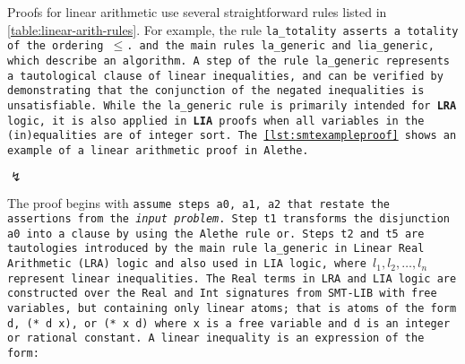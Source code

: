 Proofs for linear arithmetic use several straightforward rules listed in \cref{table:linear-arith-rules}.
For example, the rule \tt{la\_totality} asserts a totality of the ordering $\leq$.
and the main rules \tt{la\_generic} and \tt{lia\_generic}, which describe an algorithm.
A step of the rule \tt{la\_generic} represents a tautological clause of linear inequalities, and can be verified by demonstrating that the conjunction of the negated inequalities is unsatisfiable.
While the \tt{la\_generic rule} is primarily intended for \textbf{LRA} logic, it is also applied in \textbf{LIA} proofs when all variables in the (in)equalities are of integer sort.
The \cref{lst:smtexampleproof} shows an example of a linear arithmetic proof in Alethe.



\begin{center}
$\lightning$
\end{center}



The proof begins with \tt{assume} steps \tt{a0}, \tt{a1}, \tt{a2} that restate the assertions from the \emph{input problem}. %
Step \tt{t1} transforms the disjunction \texttt{a0} into a clause by using the Alethe rule \tt{or}.
Steps \tt{t2} and \tt{t5} are tautologies introduced by the main rule \tt{la\_generic}
in Linear Real Arithmetic (LRA) logic and also used in LIA logic, where \colorbox{green!30}{$l_1, l_2,\dots, l_n$} represent linear inequalities.
The \lstinline[language=SMT,basicstyle=\ttfamily\footnotesize]{Real} terms in LRA and LIA logic are constructed over the \lstinline[language=SMT,basicstyle=\ttfamily\footnotesize]{Real} and \lstinline[language=SMT,basicstyle=\ttfamily\footnotesize]{Int} signatures from SMT-LIB with free variables, but containing only linear atoms; that is
atoms of the form \lstinline[language=SMT,basicstyle=\ttfamily\footnotesize]{d}, \lstinline[language=SMT,basicstyle=\ttfamily\footnotesize]{(* d x)}, or \lstinline[language=SMT,basicstyle=\ttfamily\footnotesize]{(* x d)}  where \lstinline[language=SMT,basicstyle=\ttfamily\footnotesize]{x} is a free variable and  \lstinline[language=SMT,basicstyle=\ttfamily\footnotesize]{d} is an integer or rational constant.
A linear inequality is an expression of the form:

